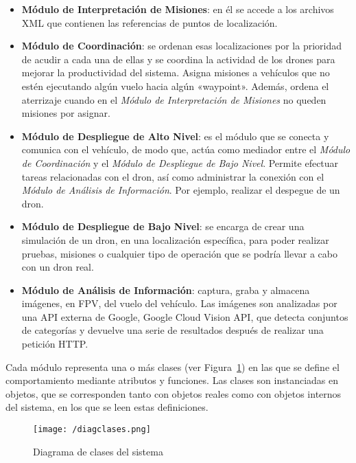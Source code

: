 \begin{itemize}
\item \textbf{Módulo de Interpretación de Misiones}: en él se accede a los archivos XML que contienen las referencias de puntos de localización.
\item \textbf{Módulo de Coordinación}: se ordenan esas localizaciones por la prioridad de acudir a cada una de ellas y se coordina la actividad de los drones para mejorar la productividad del sistema. Asigna misiones a vehículos que no estén ejecutando algún vuelo hacia algún «waypoint». Además, ordena el aterrizaje cuando en el \textit{Módulo de Interpretación de Misiones} no queden misiones por asignar.
\item \textbf{Módulo de Despliegue de Alto Nivel}: es el módulo que se conecta y comunica con el vehículo, de modo que, actúa como mediador entre el \textit{Módulo de Coordinación} y el \textit{Módulo de Despliegue de Bajo Nivel}. Permite efectuar tareas relacionadas con el dron, así como administrar la conexión con el \textit{Módulo de Análisis de Información}. Por ejemplo, realizar el despegue de un dron.
\item \textbf{Módulo de Despliegue de Bajo Nivel}: se encarga de crear una simulación de un dron, en una localización específica, para poder realizar pruebas, misiones o cualquier tipo de operación que se podría llevar a cabo con un dron real.
\item \textbf{Módulo de Análisis de Información}: captura, graba y almacena imágenes, en \acs{FPV}, del vuelo del vehículo. Las imágenes son analizadas por una \acs{API} externa de Google, Google Cloud Vision \acs{API}, que detecta conjuntos de categorías y devuelve una serie de resultados después de realizar una petición \acs{HTTP}. 
\end{itemize} 

Cada módulo representa una o más clases (ver Figura~\ref{fig:diagclases}) en las que se define el comportamiento mediante atributos y funciones. Las clases son instanciadas en objetos, que se corresponden tanto con objetos reales como con objetos internos del sistema, en los que se leen estas definiciones.

\begin{figure}[!h]
\begin{center}
\texttt{[image: /diagclases.png]}
\caption[Diagrama de clases del sistema]{Diagrama de clases del sistema}
\label{fig:diagclases}
\end{center}
\end{figure}

